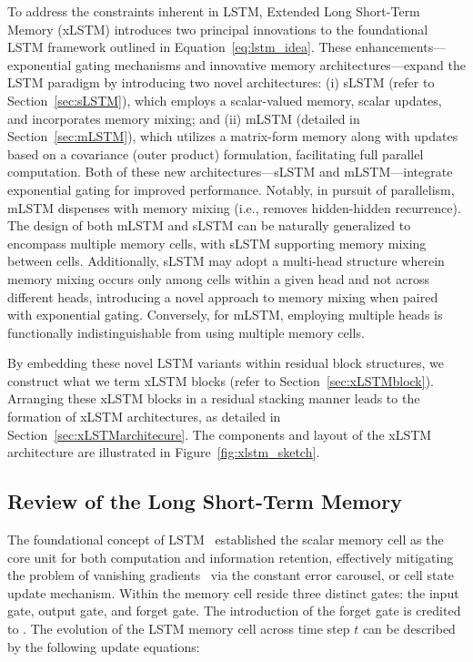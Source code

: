 To address the constraints inherent in LSTM, Extended Long Short-Term Memory (xLSTM) introduces two principal innovations to the foundational LSTM framework outlined in Equation~\eqref{eq:lstm_idea}. These enhancements—exponential gating mechanisms and innovative memory architectures—expand the LSTM paradigm by introducing two novel architectures: (i) sLSTM (refer to Section~\ref{sec:sLSTM}), which employs a scalar-valued memory, scalar updates, and incorporates memory mixing; and (ii) mLSTM (detailed in Section~\ref{sec:mLSTM}), which utilizes a matrix-form memory along with updates based on a covariance (outer product) formulation, facilitating full parallel computation. Both of these new architectures—sLSTM and mLSTM—integrate exponential gating for improved performance. Notably, in pursuit of parallelism, mLSTM dispenses with memory mixing (i.e., removes hidden-hidden recurrence). The design of both mLSTM and sLSTM can be naturally generalized to encompass multiple memory cells, with sLSTM supporting memory mixing between cells. Additionally, sLSTM may adopt a multi-head structure wherein memory mixing occurs only among cells within a given head and not across different heads, introducing a novel approach to memory mixing when paired with exponential gating. Conversely, for mLSTM, employing multiple heads is functionally indistinguishable from using multiple memory cells.

By embedding these novel LSTM variants within residual block structures, we construct what we term xLSTM blocks (refer to Section~\ref{sec:xLSTMblock}). Arranging these xLSTM blocks in a residual stacking manner leads to the formation of xLSTM architectures, as detailed in Section~\ref{sec:xLSTMarchitecure}. The components and layout of the xLSTM architecture are illustrated in Figure~\ref{fig:xlstm_sketch}.

\subsection{Review of the Long Short-Term Memory}
\label{sec:orgLSTM}

The foundational concept of LSTM~\citep{Hochreiter:91,Hochreiter:97nips,Hochreiter:97} established the scalar memory cell as the core unit for both computation and information retention, effectively mitigating the problem of vanishing gradients~\citep{Hochreiter:91,Hochreiter:00book} via the constant error carousel, or cell state update mechanism. Within the memory cell reside three distinct gates: the input gate, output gate, and forget gate. The introduction of the forget gate is credited to \citet{Gers:00}.  
The evolution of the LSTM memory cell across time step $t$ can be described by the following update equations:

